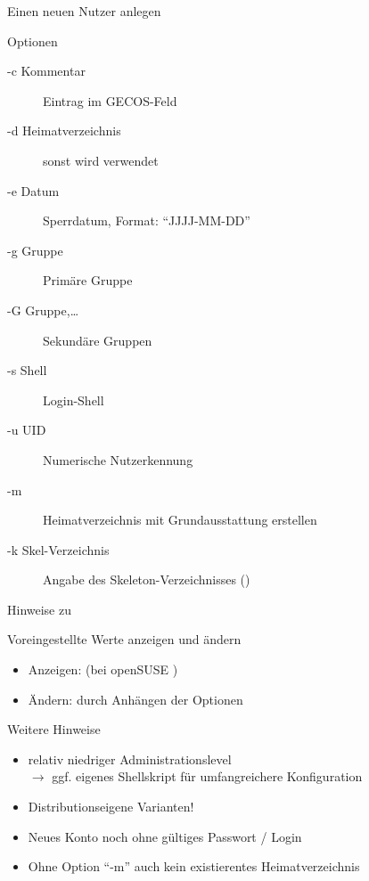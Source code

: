 \documentclass[aspectratio=43]{beamer}
\begin{document}
\begin{frame}{Einen neuen Nutzer anlegen}
  \begin{center}
    \colorbox{yellow}{}
  \end{center}
  \begin{block}{Optionen}
    \begin{description}
      \item[-c Kommentar] Eintrag im GECOS-Feld
      \item[-d Heimatverzeichnis] sonst wird  verwendet
      \item[-e Datum] Sperrdatum, Format: ``JJJJ-MM-DD''
      \item[-g Gruppe] Primäre Gruppe
      \item[-G Gruppe,\dots] Sekundäre Gruppen
      \item[-s Shell] Login-Shell
      \item[-u UID] Numerische Nutzerkennung
      \item[-m] Heimatverzeichnis mit Grundausstattung erstellen
      \item[-k Skel-Verzeichnis] Angabe des Skeleton-Verzeichnisses ()
    \end{description}
  \end{block}
\end{frame}
\begin{frame}{Hinweise zu }
  \begin{block}{Voreingestellte Werte anzeigen und ändern}
    \begin{itemize}
      \item Anzeigen:  {\color{gray} (bei openSUSE )}
      \item Ändern: durch Anhängen der Optionen
    \end{itemize}
  \end{block}
  \begin{block}{Weitere Hinweise}
    \begin{itemize}
      \item relativ niedriger Administrationslevel \\
            $\rightarrow$ ggf. eigenes Shellskript für umfangreichere Konfiguration
      \item Distributionseigene Varianten!
      \item Neues Konto noch ohne gültiges Passwort / Login
      \item Ohne Option ``-m'' auch kein existierentes Heimatverzeichnis
    \end{itemize}
  \end{block}
\end{frame}
\end{document}
